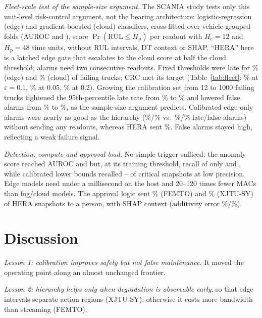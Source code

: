 \documentclass[conference]{IEEEtran}
\newcommand{\Hc}{H_{\mathrm{c}}}
\newcommand{\Hp}{H_{\mathrm{p}}}
\begin{document}
\textit{Fleet-scale test of the sample-size argument.}\label{sec:fleet} The SCANIA study tests only this unit-level risk-control argument, not the bearing architecture: logistic-regression (edge) and gradient-boosted (cloud) classifiers, cross-fitted over vehicle-grouped folds (AUROC \flAucEdge{} and \flAucCloud), score $\Pr(\mathrm{RUL}\le\Hp)$ per readout with $\Hc{=}12$ and $\Hp{=}48$ time units, without RUL intervals, DT context or SHAP. ``HERA'' here is a latched edge gate that escalates to the cloud score at half the cloud threshold; alarms need two consecutive readouts. Fixed thresholds were late for \flFixEdLate\% (edge) and \flFixClLate\% (cloud) of failing trucks; CRC met its target (Table~\ref{tab:fleet}: \flClBigLate\% at $\varepsilon{=}0.1$, \flHeFiveLate\% at 0.05, \flHeTwentyLate\% at 0.2). Growing the calibration set from 12 to 1000 failing trucks tightened the 95th-percentile late rate from \flClSmallLateQ\% to \flClBigLateQ\% and lowered false alarms from \flClSmallFa\% to \flClBigFa\%, as the sample-size argument predicts. Calibrated edge-only alarms were nearly as good as the hierarchy (\flEdBigLate\%/\flEdBigFa\% vs.\ \flHeBigLate\%/\flHeBigFa\% late/false alarms) without sending any readouts, whereas HERA sent \flHeBigEsc\%. False alarms stayed high, reflecting a weak failure signal.

\textit{Detection, compute and approval load.} No simple trigger sufficed: the anomaly score reached AUROC \feDetAnomAuroc{} and \xjDetAnomAuroc{} but, at its training threshold, recall of only \feDetAnomRec{} and \xjDetAnomRec, while calibrated lower bounds recalled \feDetEdgeLBRec--\xjDetEdgeLBRec{} of critical snapshots at low precision. Edge models need under a millisecond on the host and 20--120 times fewer MACs than fog/cloud models. The approval logic sent \feApprHera\% (FEMTO) and \xjApprHera\% (XJTU-SY) of HERA snapshots to a person, with SHAP context (additivity error \feShapRel\%/\xjShapRel\%).

\section{Discussion}
\textit{Lesson 1: calibration improves safety but not false maintenance.} It moved the operating point along an almost unchanged frontier.

\textit{Lesson 2: hierarchy helps only when degradation is observable early}, so that edge intervals separate action regions (XJTU-SY); otherwise it costs more bandwidth than streaming (FEMTO).
\end{document}
